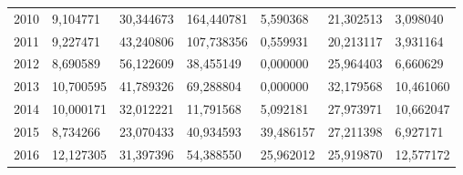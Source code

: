 \begin{table}
\begin{tabular}{p{1cm}p{2cm}p{2cm}p{2cm}p{2cm}p{2cm}p{2cm}}
 2010 &                                           9,104771 &        30,344673 &               164,440781 &                               5,590368 & 21,302513 &                3,098040 \\
 2011 &                                           9,227471 &        43,240806 &               107,738356 &                               0,559931 & 20,213117 &                3,931164 \\
 2012 &                                           8,690589 &        56,122609 &                38,455149 &                               0,000000 & 25,964403 &                6,660629 \\
 2013 &                                          10,700595 &        41,789326 &                69,288804 &                               0,000000 & 32,179568 &               10,461060 \\
 2014 &                                          10,000171 &        32,012221 &                11,791568 &                               5,092181 & 27,973971 &               10,662047 \\
 2015 &                                           8,734266 &        23,070433 &                40,934593 &                              39,486157 & 27,211398 &                6,927171 \\
 2016 &                                          12,127305 &        31,397396 &                54,388550 &                              25,962012 & 25,919870 &               12,577172 \\
\bottomrule
\end{tabular}
\end{table}
